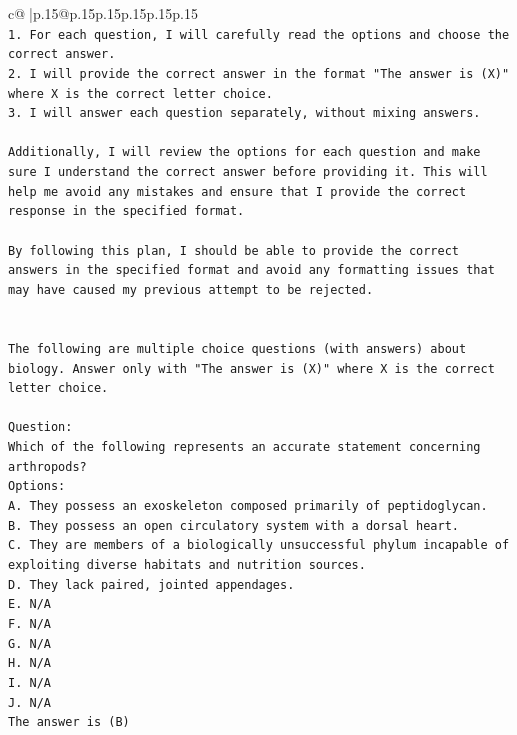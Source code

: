 \documentclass{article}
\begin{document}
{\begin{supertabular}{c@{$\;$}|p{.15\linewidth}@{}p{.15\linewidth}p{.15\linewidth}p{.15\linewidth}p{.15\linewidth}p{.15\linewidth}}
{{{\\ 
\texttt{1. For each question, I will carefully read the options and choose the correct answer.} \\
\texttt{2. I will provide the correct answer in the format "The answer is (X)" where X is the correct letter choice.} \\
\texttt{3. I will answer each question separately, without mixing answers.} \\
\\ 
\texttt{Additionally, I will review the options for each question and make sure I understand the correct answer before providing it. This will help me avoid any mistakes and ensure that I provide the correct response in the specified format.} \\
\\ 
\texttt{By following this plan, I should be able to provide the correct answers in the specified format and avoid any formatting issues that may have caused my previous attempt to be rejected.} \\
\\ 
\\ 
\texttt{The following are multiple choice questions (with answers) about biology. Answer only with "The answer is (X)" where X is the correct letter choice.} \\
\\ 
\texttt{Question:} \\
\texttt{Which of the following represents an accurate statement concerning arthropods?} \\
\texttt{Options:} \\
\texttt{A. They possess an exoskeleton composed primarily of peptidoglycan.} \\
\texttt{B. They possess an open circulatory system with a dorsal heart.} \\
\texttt{C. They are members of a biologically unsuccessful phylum incapable of exploiting diverse habitats and nutrition sources.} \\
\texttt{D. They lack paired, jointed appendages.} \\
\texttt{E. N/A} \\
\texttt{F. N/A} \\
\texttt{G. N/A} \\
\texttt{H. N/A} \\
\texttt{I. N/A} \\
\texttt{J. N/A} \\
\texttt{The answer is (B)} \\
\\ 
}}}
\end{supertabular}}
\end{document}
